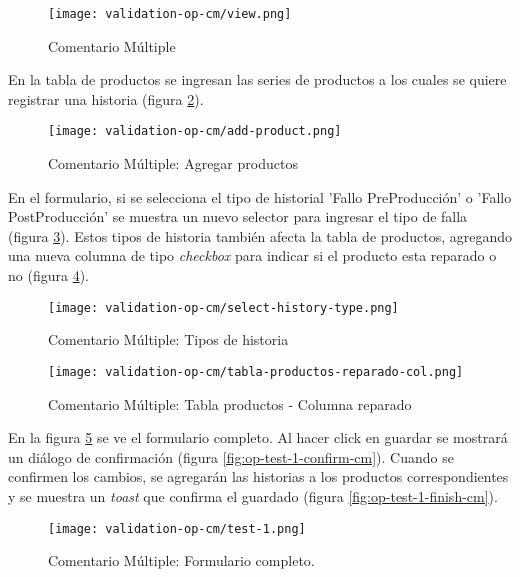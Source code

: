 \begin{figure}[H]
	\centering
	\texttt{[image: validation-op-cm/view.png]}
	\caption{\label{fig:op-view-cm} Comentario Múltiple}
\end{figure}

En la tabla de productos se ingresan las series de productos a los cuales se quiere registrar una historia (figura \ref{fig:op-add-product-cm}).

\begin{figure}[H]
	\centering
	\texttt{[image: validation-op-cm/add-product.png]}
	\caption{\label{fig:op-add-product-cm} Comentario Múltiple: Agregar productos}
\end{figure}

En el formulario, si se selecciona el tipo de historial 'Fallo PreProducción' o 'Fallo PostProducción' se muestra un nuevo selector para ingresar el tipo de falla (figura \ref{fig:op-select-history-type-cm}). Estos tipos de historia también afecta la tabla de productos, agregando una nueva columna de tipo \textit{checkbox} para indicar si el producto esta reparado o no (figura \ref{fig:op-tabla-productos-reparado-col-cm}).

\begin{figure}[H]
	\centering
	\texttt{[image: validation-op-cm/select-history-type.png]}
	\caption{\label{fig:op-select-history-type-cm} Comentario Múltiple: Tipos de historia}
\end{figure}

\begin{figure}[H]
	\centering
	\texttt{[image: validation-op-cm/tabla-productos-reparado-col.png]}
	\caption{\label{fig:op-tabla-productos-reparado-col-cm} Comentario Múltiple: Tabla productos - Columna reparado}
\end{figure}

En la figura \ref{fig:op-test-1-cm} se ve el formulario completo. Al hacer click en guardar se mostrará un diálogo de confirmación (figura \ref{fig:op-test-1-confirm-cm}). Cuando se confirmen los cambios, se agregarán las historias a los productos correspondientes y se muestra un \textit{toast} que confirma el guardado (figura \ref{fig:op-test-1-finish-cm}).

\begin{figure}[H]
	\centering
	\texttt{[image: validation-op-cm/test-1.png]}
	\caption{\label{fig:op-test-1-cm} Comentario Múltiple: Formulario completo.}
\end{figure}

